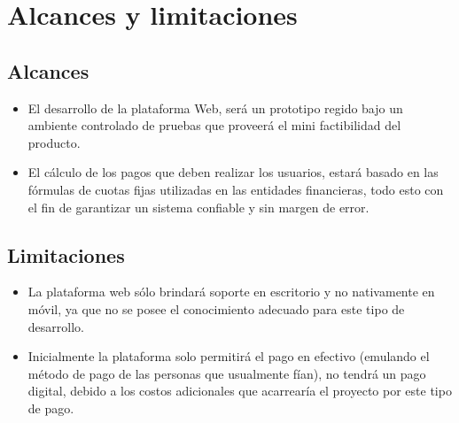 \section{Alcances y limitaciones}

	\subsection{Alcances}
	\begin{itemize}
		
		\item El desarrollo de la plataforma Web, será un prototipo regido bajo un ambiente controlado de pruebas que proveerá el mini factibilidad del producto.
		\item El cálculo de los pagos que deben realizar los usuarios, estará basado en las fórmulas de cuotas fijas utilizadas en las entidades financieras, todo esto con el fin de garantizar un sistema confiable y sin margen de error.
		
	\end{itemize}
	
	\subsection{Limitaciones}
	\begin{itemize}
		
		\item La plataforma web sólo brindará soporte en escritorio y no nativamente en móvil, ya que no se posee el conocimiento adecuado para este tipo de desarrollo.
		
		\item Inicialmente la plataforma solo permitirá el pago en efectivo (emulando el método de pago de las personas que usualmente fían), no tendrá un pago digital, debido a los costos adicionales que acarrearía el proyecto por este tipo de pago.
		
	\end{itemize}
